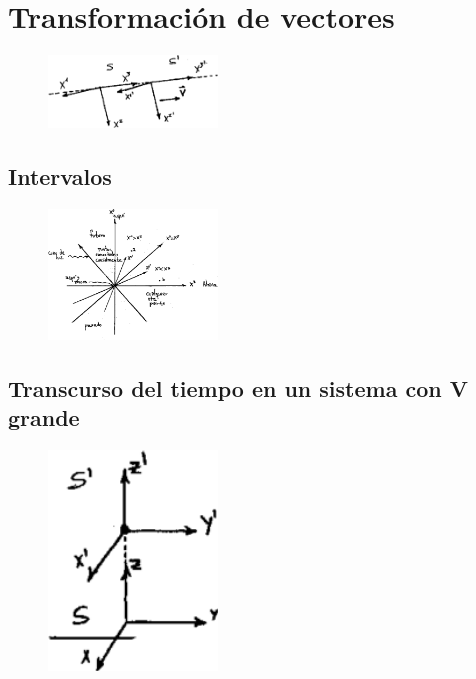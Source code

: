 \documentclass[10pt,oneside]{CBFT_book}
\begin{document}
\section{Transformación de vectores}

\begin{figure}[htb]
	\begin{center}
	\includegraphics[width=0.4\textwidth]{images/fig_ft1_transfvec.pdf}	 
	\end{center}
	\caption{}
\end{figure} 


\subsection{Intervalos}

\begin{figure}[htb]
	\begin{center}
	\includegraphics[width=0.4\textwidth]{images/fig_ft1_intervalos.pdf}	 
	\end{center}
	\caption{}
\end{figure} 

\subsection{Transcurso del tiempo en un sistema con V grande}

\begin{figure}[htb]
	\begin{center}
	\includegraphics[width=0.4\textwidth]{images/fig_ft1_vgrande.pdf}	 
	\end{center}
	\caption{}
\end{figure} 




\end{document}
